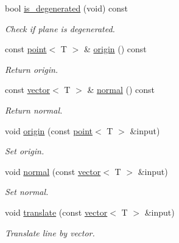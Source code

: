 \begin{DoxyCompactItemize}
\mbox{\label{classddd_1_1plane_a6544379a0cbadf2015ad1cbda3427ecb}} 
bool \hyperlink{classddd_1_1plane_a6544379a0cbadf2015ad1cbda3427ecb}{is\+\_\+degenerated} (void) const
\begin{DoxyCompactList}\small\item\em Check if plane is degenerated. \end{DoxyCompactList}\item 
\mbox{\label{classddd_1_1plane_af6a195c3b73a20a3b0a02040b79ada07}} 
const \hyperlink{classddd_1_1point}{point}$<$ T $>$ \& \hyperlink{classddd_1_1plane_af6a195c3b73a20a3b0a02040b79ada07}{origin} () const
\begin{DoxyCompactList}\small\item\em Return origin. \end{DoxyCompactList}\item 
\mbox{\label{classddd_1_1plane_a4d4ef359d3b0e904b5441f4d37fc7220}} 
const \hyperlink{classddd_1_1vector}{vector}$<$ T $>$ \& \hyperlink{classddd_1_1plane_a4d4ef359d3b0e904b5441f4d37fc7220}{normal} () const
\begin{DoxyCompactList}\small\item\em Return normal. \end{DoxyCompactList}\item 
void \hyperlink{classddd_1_1plane_ac820ca045c22c4f4672adc9efd8b8cf3}{origin} (const \hyperlink{classddd_1_1point}{point}$<$ T $>$ \&input)
\begin{DoxyCompactList}\small\item\em Set origin. \end{DoxyCompactList}\item 
void \hyperlink{classddd_1_1plane_a938cb0c882eeb20b1b600bb9f89fb039}{normal} (const \hyperlink{classddd_1_1vector}{vector}$<$ T $>$ \&input)
\begin{DoxyCompactList}\small\item\em Set normal. \end{DoxyCompactList}\item 
void \hyperlink{classddd_1_1plane_a452cbfa144468d3748b424b18f045c24}{translate} (const \hyperlink{classddd_1_1vector}{vector}$<$ T $>$ \&input)
\begin{DoxyCompactList}\small\item\em Translate line by vector. \end{DoxyCompactList}\item 

\end{DoxyCompactItemize}
